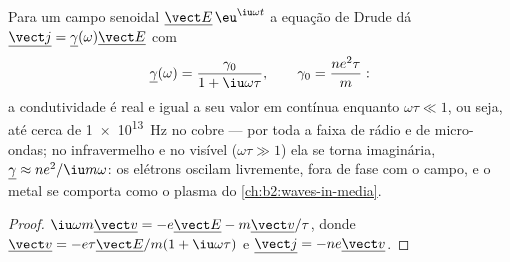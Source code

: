 \begin{proposition}\label{prop:b2:charges-currents-conduction:acdrude}
Para um campo senoidal $\underline{\vect E}\,\eu^{\iu\omega t}$ a equação de Drude
dá $\underline{\vect j} = \underline\gamma(\omega)\underline{\vect E}$ com
\[
\underline\gamma(\omega) = \frac{\gamma_0}{1 + \iu\omega\tau} , \qquad \gamma_0 = \frac{ne^2\tau}{m} :
\]
a condutividade é real e igual a seu valor em contínua enquanto $\omega\tau
\ll 1$, ou seja, até cerca de \qty{1e13}{Hz} no cobre --- por toda a faixa
de rádio e de micro-ondas; no infravermelho e no visível ($\omega\tau \gg 1$)
ela se torna imaginária, $\underline\gamma \approx ne^2/\iu m\omega$: os elétrons
oscilam livremente, fora de fase com o campo, e o metal se comporta
como o plasma do \cref{ch:b2:waves-in-media}.
\end{proposition}

\begin{proof}
$\iu\omega m\underline{\vect v} = -e\underline{\vect E} - m\underline{\vect v}/\tau$, donde
$\underline{\vect v} = -e\tau\underline{\vect E}/m(1 + \iu\omega\tau)$ e $\underline{\vect j}
= -ne\underline{\vect v}$.
\end{proof}

